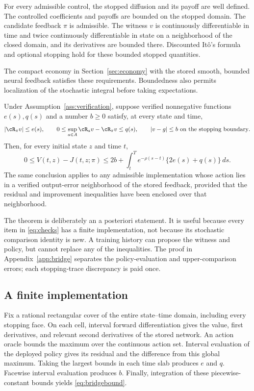 \begin{assumption}\label{ass:verification}
For every admissible control, the stopped diffusion and its payoff are well defined. The controlled coefficients and payoffs are bounded on the stopped domain. The candidate feedback $\pi$ is admissible. The witness $v$ is continuously differentiable in time and twice continuously differentiable in state on a neighborhood of the closed domain, and its derivatives are bounded there. Discounted It\^o's formula and optional stopping hold for these bounded stopped quantities.
\end{assumption}
The compact economy in Section~\ref{sec:economy} with the stored smooth, bounded neural feedback satisfies these requirements. Boundedness also permits localization of the stochastic integral before taking expectations.

\begin{theorem}\label{thm:bridge}
Under Assumption~\ref{ass:verification}, suppose verified nonnegative functions $e(s),q(s)$ and a number $b\geq0$ satisfy, at every state and time,
\begin{equation}
 |\cR_\pi v|\leq e(s),\qquad
 0\leq\sup_{a\in A}\cR_a v-\cR_\pi v\leq q(s),
 \qquad |v-g|\leq b\ \hbox{on the stopping boundary}.
 \label{eq:checks}
\end{equation}
Then, for every initial state $z$ and time $t$,
\begin{equation}
 0\leq V(t,z)-J(t,z;\pi)
 \leq 2b+\int_t^T e^{-\rho(s-t)}\{2e(s)+q(s)\}\,ds.
 \label{eq:bridgebound}
\end{equation}
The same conclusion applies to any admissible implementation whose action lies in a verified output-error neighborhood of the stored feedback, provided that the residual and improvement inequalities have been enclosed over that neighborhood.
\end{theorem}

The theorem is deliberately an a posteriori statement. It is useful because every item in \eqref{eq:checks} has a finite implementation, not because its stochastic comparison identity is new. A training history can propose the witness and policy, but cannot replace any of the inequalities. The proof in Appendix~\ref{app:bridge} separates the policy-evaluation and upper-comparison errors; each stopping-trace discrepancy is paid once.

\subsection{A finite implementation}
Fix a rational rectangular cover of the entire state--time domain, including every stopping face. On each cell, interval forward differentiation gives the value, first derivatives, and relevant second derivatives of the stored network. An action oracle bounds the maximum over the continuous action set. Interval evaluation of the deployed policy gives its residual and the difference from this global maximum. Taking the largest bounds in each time slab produces $e$ and $q$. Facewise interval evaluation produces $b$. Finally, integration of these piecewise-constant bounds yields \eqref{eq:bridgebound}.

